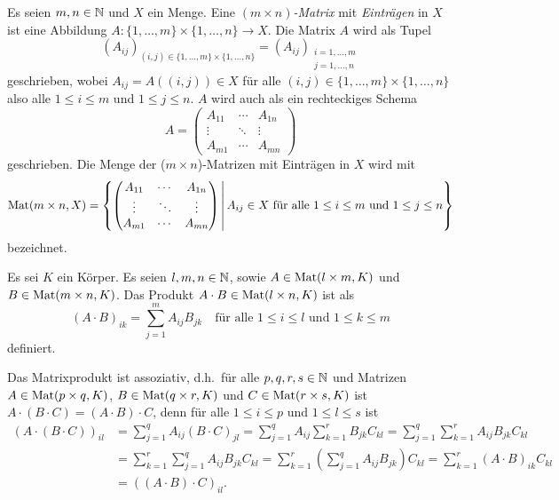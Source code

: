 \begin{defi}
 Es seien $m, n \in \mathbb{N}$ und $X$ ein Menge. Eine \emph{$(m \times n)$-Matrix} mit \emph{Einträgen} in $X$ ist eine Abbildung $A \colon \{1, \dotsc, m\} \times \{1, \dotsc, n\} \to X$. Die Matrix $A$ wird als Tupel
 \[
  (A_{ij})_{(i,j) \in \{1, \dotsc, m\} \times \{1, \dotsc, n\}}
  =
  (A_{ij})_{\substack{i = 1, \dotsc, m \\ j = 1, \dotsc, n}}
 \]
 geschrieben, wobei $A_{ij} = A((i,j)) \in X$ für alle $(i,j) \in \{1, \dotsc, m\} \times \{1, \dotsc, n\}$ also alle $1 \leq i \leq m$ und $1 \leq j \leq n$. $A$ wird auch als ein rechteckiges Schema
 \[
  A =
  \begin{pmatrix}
   A_{11} & \cdots & A_{1n} \\
   \vdots & \ddots & \vdots \\
   A_{m1} & \cdots & A_{mn}
  \end{pmatrix}
 \]
 geschrieben. Die Menge der ($m \times n$)-Matrizen mit Einträgen in $X$ wird mit
 \[
  \mathrm{Mat}(m \times n, X)
  =
  \left\{
   \begin{pmatrix}
    A_{11} & \cdots & A_{1n} \\
    \vdots & \ddots & \vdots \\
    A_{m1} & \cdots & A_{mn}
   \end{pmatrix}
   \,\middle|\,
    \text{$A_{ij} \in X$ für alle $1 \leq i \leq m$ und $1 \leq j \leq n$}
  \right\}
 \]
 bezeichnet.
\end{defi}


\begin{defi}
 Es sei $K$ ein Körper. Es seien $l,m,n \in \mathbb{N}$, sowie $A \in \mathrm{Mat}(l \times m, K)$ und $B \in \mathrm{Mat}(m \times n, K)$. Das Produkt $A \cdot B \in \mathrm{Mat}(l \times n, K)$ ist als
 \[
  (A \cdot B)_{ik} = \sum_{j=1}^m A_{ij} B_{jk}
  \quad
  \text{für alle $1 \leq i \leq l$ und $1 \leq k \leq m$}
 \]
 definiert.
\end{defi}


\begin{bem}
 Das Matrixprodukt ist assoziativ, d.h.\ für alle $p,q,r,s \in \mathbb{N}$ und Matrizen $A \in \mathrm{Mat}(p \times q, K)$, $B \in \mathrm{Mat}(q \times r, K)$ und $C \in \mathrm{Mat}(r \times s, K)$ ist $A \cdot (B \cdot C) = (A \cdot B) \cdot C$, denn für alle $1 \leq i \leq p$ und $1 \leq l \leq s$ ist
 \begin{align*}
  (A \cdot (B \cdot C))_{il}
  &= \sum_{j=1}^q A_{ij} (B \cdot C)_{jl}
  = \sum_{j=1}^q A_{ij} \sum_{k=1}^r B_{jk} C_{kl}
  = \sum_{j=1}^q \sum_{k=1}^r A_{ij} B_{jk} C_{kl} \\
  &= \sum_{k=1}^r \sum_{j=1}^q A_{ij} B_{jk} C_{kl}
  = \sum_{k=1}^r \left( \sum_{j=1}^q A_{ij} B_{jk} \right) C_{kl}
  = \sum_{k=1}^r (A \cdot B)_{ik} C_{kl} \\
  &= ((A \cdot B) \cdot C)_{il}.
 \end{align*}
\end{bem}


